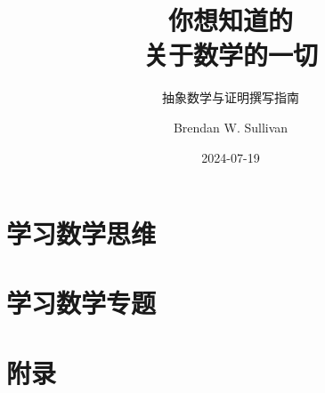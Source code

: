 \documentclass[lang=cn,color=green,12pt]{elegantbook}
\title{你想知道的\\关于数学的一切}
\subtitle{抽象数学与证明撰写指南}
\author{Brendan W. Sullivan}
\date{2024-07-19}
\begin{document}
\makecover


\frontmatter

\tableofcontents

\mainmatter

\part{学习数学思维}\label{part:Part One}








\part{学习数学专题}\label{part:Part Two}





\appendix

\part{附录}\label{part:Appendix}





\newpage

\makeunder
\end{document}
